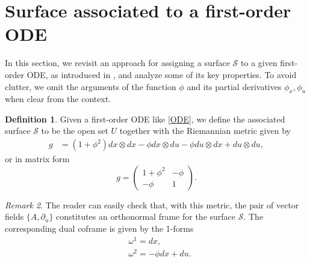\documentclass{article}
\theoremstyle{remark}
\newtheorem{remark}{Remark}[section]
\theoremstyle{definition}
\newtheorem{definition}[remark]{Definition}
\begin{document}
\section{Surface associated to a first-order ODE}\label{secBay}

In this section, we revisit an approach for assigning a surface $\mathcal{S}$ to a given first-order ODE, as introduced in \cite{Bayrakdar2018a,Bayrakdar2018,autonomous2ODE,integrationJacobifields}, and analyze some of its key properties. To avoid clutter, we omit the arguments of the function $\phi$ and its partial derivatives $\phi_x, \phi_u$ when clear from the context.

\begin{definition}\label{def:asurf}
Given a first-order ODE like \eqref{ODE}, we define the associated surface $\mathcal{S}$ to be the open set $U$ together with the Riemannian metric given by
\begin{align}\label{metricBay}
    g&=( 1+ \phi^2)dx\otimes dx-\phi dx\otimes du-\phi du\otimes dx+du\otimes du,
\end{align}
or in matrix form
\begin{equation}
    g=\begin{pmatrix}
    1+ \phi^2 & -\phi \\
    - \phi  & 1
    \end{pmatrix}.
\end{equation}
\end{definition}

\begin{remark}\label{rem:prop}
The reader can easily check that, with this metric, the pair of vector fields $\{A, \partial_u\}$ constitutes an orthonormal frame for the surface $\mathcal{S}$. The corresponding dual coframe is given by the 1-forms
\begin{align*}
& \omega^1=dx,\\
& \omega^2=-\phi dx+du.
\end{align*}
\end{remark}

    
\end{document}
